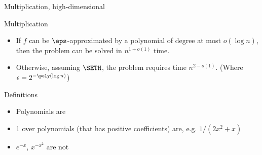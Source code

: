 \begin{frame}{Multiplication, high-dimensional}

\begin{block}{Multiplication}
\begin{itemize}
    \item<+-> If $f$ can be $\eps$-approximated by a polynomial of degree at most $o(\log n)$, then the problem can be solved in $n^{1+o(1)}$ time.
    \item<+-> Otherwise, assuming $\SETH$, the problem requires time $n^{2 - o(1)}$. (Where $\epsilon = 2^{-\poly (\log n)}$)
\end{itemize}
\end{block}

\end{frame}


\begin{frame}{Definitions}
\begin{itemize}
  \item <+-> Polynomials are
  \item <+-> 1 over polynomials (that has positive coefficients) are, e.g. $1/(2x^2+x)$
  \item <+-> $e^{-x}$, $x^{-x^2}$ are not 
\end{itemize}

\end{frame}

